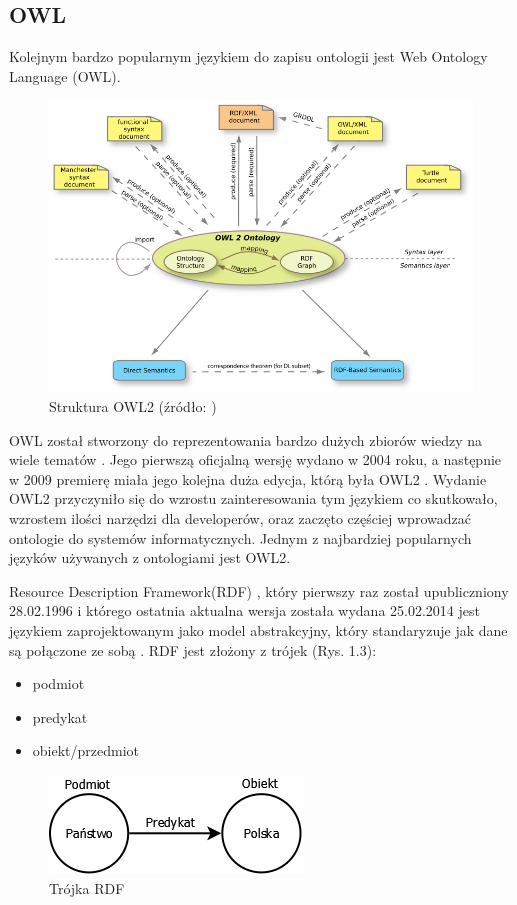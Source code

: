 \documentclass[a4paper,12pt, twoside]{book} %
\begin{document}
\subsection{OWL}
Kolejnym bardzo popularnym językiem do zapisu ontologii jest Web Ontology Language (OWL).
\begin{figure}[h]
	\centering
	\includegraphics[scale=0.65]{OWL2-structure2-800.png}
	\caption{Struktura OWL2 (źródło: \cite{owldok})}
\end{figure}
 OWL został stworzony do reprezentowania bardzo dużych zbiorów wiedzy na wiele tematów \cite{wow}. Jego pierwszą oficjalną wersję wydano w 2004 roku, a następnie w 2009 premierę miała jego kolejna duża edycja, którą była OWL2 \cite{C.MariaKeet.2020}.
 Wydanie OWL2 przyczyniło się do wzrostu zainteresowania tym językiem co skutkowało, wzrostem ilości narzędzi dla developerów, oraz zaczęto częściej wprowadzać ontologie do systemów informatycznych. Jednym z najbardziej popularnych języków używanych z ontologiami jest OWL2.
 
 
 Resource Description Framework(RDF) \cite{wow}, który pierwszy raz został upubliczniony 28.02.1996 i którego ostatnia aktualna wersja została wydana 25.02.2014 jest językiem zaprojektowanym jako model abstrakcyjny, który standaryzuje jak dane są połączone ze sobą \cite{wikipediaRDF}. RDF jest złożony z trójek (Rys. 1.3):
\begin{itemize}
	\item podmiot
	\item predykat
	\item obiekt/przedmiot
\end{itemize}
\begin{figure}[h]
	\centering
	\includegraphics[scale=0.75]{Diagram1.png}
	\caption{Trójka RDF}
\end{figure}
\end{document}
